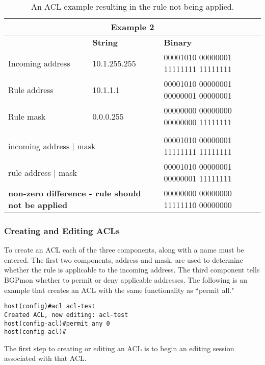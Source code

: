 \begin{table*}[htb]
\centering
\caption{\label{tbl:acl:notapply}An ACL example resulting in the rule not being applied.}
\begin{tabular}{|p{90pt}|p{90pt}|p{200pt}|}
\hline
\multicolumn{3}{|c|}{\textbf{Example 2}}\\ 
\hline
 & \textbf{String} & \textbf{Binary} \\ 
\hline
Incoming address & 10.1.255.255 & 00001010 00000001 11111111 11111111 \\
\hline
Rule address & 10.1.1.1 & 00001010 00000001 00000001 00000001 \\
\hline
Rule mask & 0.0.0.255 & 00000000 00000000 00000000 11111111 \\
\hline
\multicolumn{3}{|c|}{ } \\
\hline
\multicolumn{2}{|l|}{ incoming address $\mid$ mask } & 00001010 00000001 11111111 11111111 \\
\hline
\multicolumn{2}{|l|}{ rule address $\mid$ mask } & 00001010 00000001 00000001 11111111 \\
\hline
\multicolumn{2}{|l|}{ \bf{non-zero difference - rule should not be applied} } & 00000000 00000000 11111110 00000000 \\
\hline
\end{tabular}
\end{table*}

\subsubsection{Creating and Editing ACLs}
\label{sec:configure:acl:createedit}

To create an ACL each of the three components, along with a name must be entered.
The first two components, address and mask, are used to determine whether the rule is applicable to the incoming address.
The third component tells BGPmon whether to permit or deny applicable addresses.
The following is an example that creates an ACL with the same functionality as ``permit all."

\begin{Verbatim}[frame=single]
host(config)#acl acl-test
Created ACL, now editing: acl-test
host(config-acl)#permit any 0
host(config-acl)#
\end{Verbatim}

The first step to creating or editing an ACL is to begin an editing session associated with that ACL.\\

